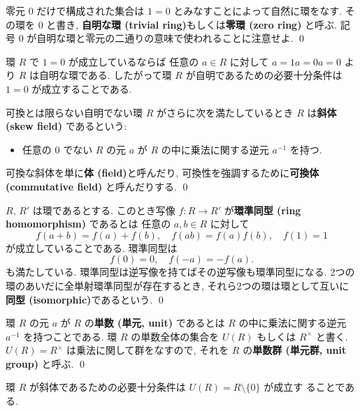 \documentclass[12pt,twoside]{jarticle}
\begin{document}
\begin{definition}[自明な環]
 零元 $0$ だけで構成された集合は $1=0$ とみなすことによって自然に環をなす. 
 その環を $0$ と書き, 
 {\bf 自明な環 (trivial ring)}もしくは{\bf 零環 (zero ring)} と呼ぶ. 
 記号 $0$ が自明な環と零元の二通りの意味で使われることに注意せよ. 
 \qed
\end{definition}

環 $R$ で $1=0$ が成立しているならば
任意の $a\in R$ に対して $a=1a=0a=0$ より $R$ は自明な環である.
したがって環 $R$ が自明であるための必要十分条件は $1=0$ が成立することである.

\begin{definition}[斜体, 体]
 可換とは限らない自明でない環 $R$ がさらに次を満たしているとき %
 $R$ は{\bf 斜体 (skew field)} であるという:
 \begin{itemize}
  \item 任意の $0$ でない $R$ の元 $a$ が %
   $R$ の中に乗法に関する逆元 $a^{-1}$ を持つ.
 \end{itemize}
 可換な斜体を単に{\bf 体 (field)}と呼んだり, 
 可換性を強調するために{\bf 可換体 (commutative field)} と呼んだりする.
 \qed
\end{definition}

\begin{definition}[環準同型]
 $R$, $R'$ は環であるとする. 
 このとき写像 $f:R\to R'$ が{\bf 環準同型 (ring homomorphism)} であるとは
 任意の $a,b\in R$ に対して
 \begin{equation*}
  f(a+b)=f(a)+f(b), \quad f(ab)=f(a)f(b), \quad f(1)=1
 \end{equation*}
 が成立していることである. 環準同型は
 \begin{equation*}
  f(0) = 0, \quad f(-a)=-f(a).
 \end{equation*}
 も満たしている.
 環準同型は逆写像を持てばその逆写像も環準同型になる.
 2つの環のあいだに全単射環準同型が存在するとき, 
 それら2つの環は環として互いに{\bf 同型 (isomorphic)}であるという.
 \qed
\end{definition}

\begin{definition}[単数, 単元]
 環 $R$ の元 $a$ が $R$ の{\bf 単数 (単元, unit)} であるとは %
 $R$ の中に乗法に関する逆元 $a^{-1}$ を持つことである.
 環 $R$ の単数全体の集合を $U(R)$ もしくは $R^\times$ と書く.
 $U(R)=R^\times$ は乗法に関して群をなすので, 
 それを $R$ の{\bf 単数群 (単元群, unit group)} と呼ぶ.
 \qed
\end{definition}

環 $R$ が斜体であるための必要十分条件は $U(R)=R\setminus\{0\}$ が成立す
ることである.
\end{document}
